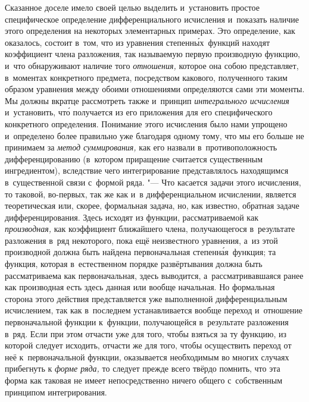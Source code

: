 Сказанное доселе имело своей целью выделить и~установить простое специфическое
определение дифференциального исчисления и~показать наличие этого определения
на некоторых элементарных примерах. Это определение, как оказалось, состоит
в~том, что из уравнения степенн\'{ы}х~функций находят коэффициент члена разложения,
так называемую первую производную функцию, и~что обнаруживают наличие того
{\em отношения,} которое она собою представляет, в~моментах конкретного
предмета, посредством какового, полученного таким образом уравнения между
обоими отношениями определяются сами эти моменты. Мы должны вкратце рассмотреть
также и~принцип {\em интегрального исчисления} и~установить, чт\'{о} получается из
его приложения для его специфического конкретного определения. Понимание этого
исчисления было нами упрощено и~определено более правильно уже благодаря одному
тому, что мы его больше не принимаем за {\em метод суммирования,} как его
назвали в~противоположность дифференцированию (в~котором приращение считается
существенным ингредиентом), вследствие чего интегрирование представлялось
находящимся в~существенной связи с~формой ряда. "--- Что касается задачи этого
исчисления, то таковой, во-первых, так же как и~в дифференциальном исчислении,
является теоретическая или, скорее, формальная задача, но, как известно,
обратная задаче дифференцирования. Здесь исходят из функции, рассматриваемой
как {\em производная,} как коэффициент ближайшего члена, получающегося
в~результате разложения в~ряд некоторого, пока ещё неизвестного уравнения, а~из
этой производной должна быть найдена первоначальная степенн\'{а}я~функция; та
функция, которая в~естественном \label{bkm:bm53b}порядке развёртывания должна
быть рассматриваема как первоначальная, здесь выводится, а~рассматривавшаяся
ранее как производная есть здесь данная или вообще начальная. Но формальная
сторона этого действия представляется уже выполненной дифференциальным
исчислением, так как в~последнем устанавливается вообще переход и~отношение
первоначальной функции к~функции, получающейся в~результате разложения в~ряд.
Если при этом отчасти уже для того, чтобы взяться за ту функцию, из которой
следует исходить, отчасти же для того, чтобы осуществить переход от неё
к~первоначальной функции, оказывается необходимым во многих случаях прибегнуть
к {\em форме ряда,} то следует прежде всего твёрдо помнить, что эта форма как
таковая не имеет непосредственно ничего общего с~собственным принципом
интегрирования.

